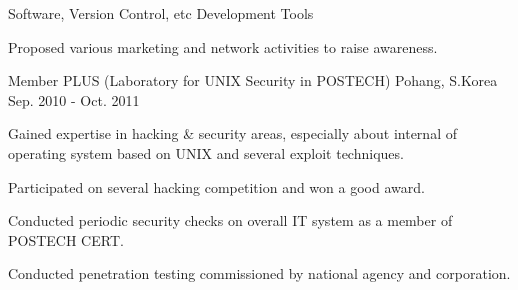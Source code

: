 

\begin{cventries}

  \cventry
    {Software, Version Control, etc} %
    {Development Tools}
    {} %
    {} %
    {
      \begin{cvitems} %
        \item 
        \item {Proposed various marketing and network activities to raise awareness.}
      \end{cvitems}
    }

  \cventry
    {Member} %
    {PLUS (Laboratory for UNIX Security in POSTECH)} %
    {Pohang, S.Korea} %
    {Sep. 2010 - Oct. 2011} %
    {
      \begin{cvitems} %
        \item {Gained expertise in hacking \& security areas, especially about internal of operating system based on UNIX and several exploit techniques.}
        \item {Participated on several hacking competition and won a good award.}
        \item {Conducted periodic security checks on overall IT system as a member of POSTECH CERT.}
        \item {Conducted penetration testing commissioned by national agency and corporation.}
      \end{cvitems}
    }

\end{cventries}
